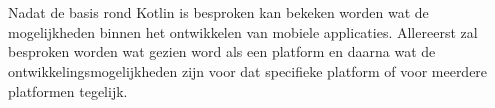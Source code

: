 \section{}
\label{sec:SVZplatformen-ontwikkelingsvormen}


Nadat de basis rond Kotlin is besproken kan bekeken worden wat de mogelijkheden binnen het ontwikkelen van mobiele applicaties. Allereerst zal besproken worden wat gezien word als een platform en daarna wat de ontwikkelingsmogelijkheden zijn voor dat specifieke platform of voor meerdere platformen tegelijk.

\subsection{}
\label{sec:SVZplatform}

